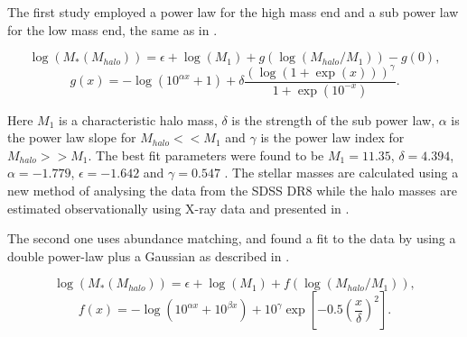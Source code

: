 
The first study \textcite{Kravtsov2018} employed a power law for the high mass end and a sub power law for the low mass end, the same as in \textcite{Behroozi2013}.

\begin{equation} \label{eq_zainsi}
    \log(M_*(M_{halo})) = \epsilon +  \log(M_1) + g(\log(M_{halo}/M_1)) -g(0),
\end{equation}
\begin{equation*}
    g(x) = -\log(10^{\alpha x}+1)+\delta \frac{(\log(1+\exp(x)))^\gamma}{1 +\exp(10^{-x})}.
\end{equation*}

Here $M_1$ is a characteristic halo mass, $\delta$ is the strength of the sub power law, $\alpha$ is the power law slope for $M_{halo} << M_1$ and $\gamma$ is the power law index for $M_{halo} >> M_1$.  The best fit parameters were found to be $M_1 = 11.35$, $\delta = 4.394$, $\alpha = -1.779$, $\epsilon = -1.642$  and $\gamma = 0.547$ \parencite{Kravtsov2018}. The stellar masses are calculated using a new method of analysing the data from the SDSS DR8 \parencite{Ahn2012} while the halo masses are estimated observationally using X-ray data and presented in \textcite{Gonzales2013}.

The second one uses abundance matching, and found a fit to the data by using a double power-law plus a Gaussian as described in \textcite{Behroozi2019}.

\begin{equation} \label{eq_behroozi}
    \log(M_*(M_{halo})) = \epsilon + \log(M_1) + f(\log(M_{halo}/M_1)),
\end{equation}
\begin{equation*}
    f(x) = -\log(10^{\alpha x}+10^{\beta x})+ 10^\gamma \exp[-0.5 (\frac{x}{\delta})^2].
\end{equation*}

